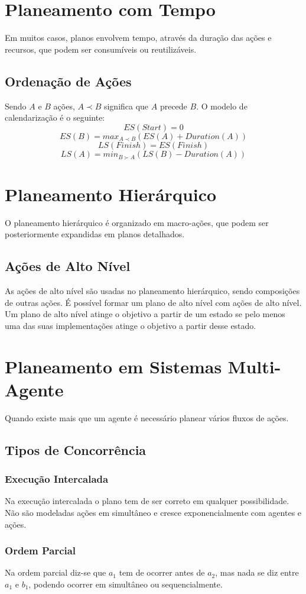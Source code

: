 \documentclass[10pt,a4paper]{report}
\begin{document}
\section{Planeamento com Tempo}
Em muitos casos, planos envolvem tempo, através da duração das ações e recursos, que podem ser consumíveis ou reutilizáveis.
\subsection{Ordenação de Ações}
Sendo $A$ e $B$  ações, $A \prec B$ significa que $A$ precede $B$. O modelo de calendarização é o seguinte:
$$
ES(Start) = 0
$$
$$
ES(B) = max_{A \prec B}(ES(A) + Duration(A))
$$
$$
LS(Finish) = ES(Finish)
$$
$$
LS(A) = min_{B \succ A}(LS(B) - Duration(A))
$$
\section{Planeamento Hierárquico}
O planeamento hierárquico é organizado em macro-ações, que podem ser posteriormente expandidas em planos detalhados.
\subsection{Ações de Alto Nível}
As ações de alto nível são usadas no planeamento hierárquico, sendo composições de outras ações. É possível formar um plano de alto nível com ações de alto nível. Um plano de alto nível atinge o objetivo a partir de um estado se pelo menos uma das suas implementações atinge o objetivo a partir desse estado.
\section{Planeamento em Sistemas Multi-Agente}
Quando existe mais que um agente é necessário planear vários fluxos de ações.
\subsection{Tipos de Concorrência}
\subsubsection{Execução Intercalada}
Na execução intercalada o plano tem de ser correto em qualquer possibilidade. Não são modeladas ações em simultâneo e cresce exponencialmente com agentes e ações.
\subsubsection{Ordem Parcial}
Na ordem parcial diz-se que $a_1$ tem de ocorrer antes de $a_2$, mas nada se diz entre $a_1$ e $b_1$, podendo ocorrer em simultâneo ou sequencialmente.
\end{document}
